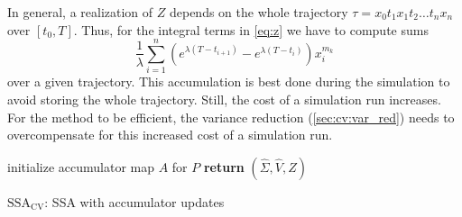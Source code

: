 In general, a realization of $Z$ depends on the whole trajectory $\tau=x_0t_1 x_1 t_2 \dots\allowbreak t_n x_n$ over $[t_0,T]$.
Thus, for the integral terms
in \eqref{eq:z} we have to compute sums
\begin{equation}\label{eq:dis_int}
    \frac{1}{\lambda}\sum_{i=1}^n\left(e^{\lambda(T - t_{i+1})}
    - e^{\lambda(T-t_i)}\right)x_i^{m_k}
\end{equation}
over a given trajectory.
This accumulation is best done during the simulation to avoid storing the whole trajectory.
Still, the cost of a simulation run increases.
For the method to be efficient, the variance reduction (\autoref{sec:cv:var_red}) needs
to overcompensate for this increased cost of a simulation run.
\begin{algorithm}
    initialize accumulator map $A$ for $P$\;
    \textbf{return} $(\hat{\Sigma},\hat{V}, \hat{Z})$\;
    \caption{\label{alg:ssa_lcv}$\text{SSA}_{\text{CV}}$: \ac{SSA} with accumulator updates}
\end{algorithm}

